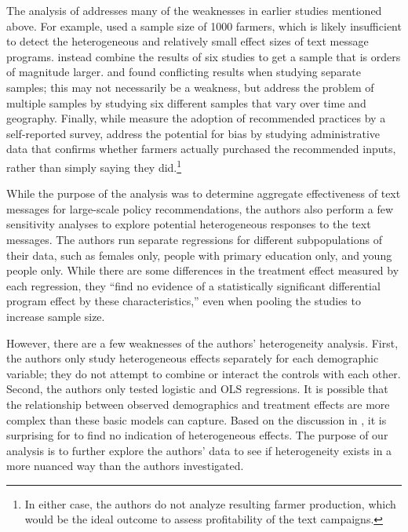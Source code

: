 \documentclass[12pt]{article}
\begin{document}
The analysis of \textcite{fabregas_digital_2025} addresses many of the weaknesses in earlier studies mentioned above. For example, \textcite{fafchamps_impact_2012} used a sample size of 1000 farmers, which is likely insufficient to detect the heterogeneous and relatively small effect sizes of text message programs. \textcite{fabregas_digital_2025} instead combine the results of six studies to get a sample that is orders of magnitude larger. \textcite{casaburi_harnessing_2019} and \textcite{casaburi_management_2016} found conflicting results when studying separate samples; this may not necessarily be a weakness, but \textcite{fabregas_digital_2025} address the problem of multiple samples by studying six different samples that vary over time and geography. Finally, while \textcite{carrion-yaguana_promoting_2020} measure the adoption of recommended practices by a self-reported survey, \textcite{fabregas_digital_2025} address the potential for bias by studying administrative data that confirms whether farmers actually purchased the recommended inputs, rather than simply saying they did.\footnote{In either case, the authors do not analyze resulting farmer production, which would be the ideal outcome to assess profitability of the text campaigns.}

While the purpose of the \textcite{fabregas_digital_2025} analysis was to determine aggregate effectiveness of text messages for large-scale policy recommendations, the authors also perform a few sensitivity analyses to explore potential heterogeneous responses to the text messages. The authors run separate regressions for different subpopulations of their data, such as females only, people with primary education only, and young people only. While there are some differences in the treatment effect measured by each regression, they ``find no evidence of a statistically significant differential program effect by these characteristics,'' even when pooling the studies to increase sample size. 

However, there are a few weaknesses of the authors' heterogeneity analysis. First, the authors only study heterogeneous effects separately for each demographic variable; they do not attempt to combine or interact the controls with each other. Second, the authors only tested logistic and OLS regressions. It is possible that the relationship between observed demographics and treatment effects are more complex than these basic models can capture. Based on the discussion in \textcite{aker_promise_2016}, it is surprising for \textcite{fabregas_digital_2025} to find no indication of heterogeneous effects. The purpose of our analysis is to further explore the authors' data to see if heterogeneity exists in a more nuanced way than the authors investigated.
\end{document}
